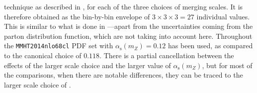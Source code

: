 technique as described in \cite{Frederix:2011ss}, for each of the
three choices of merging scales. It is therefore obtained
as the bin-by-bin envelope of $3 \times 3 \times 3 = 27$ individual
values. This is similar to what is done in
\cite{Frederix:2015eii}---apart from the uncertainties coming
from the parton distribution function, which are not taking into
account here. Throughout the \texttt{MMHT2014nlo68cl} PDF set with 
$\alpha_\mathrm{s}(m_Z)=0.12$ has been used, as compared to the canonical choice
of $0.118$. There is a partial cancellation between the effects of the larger scale choice
and the larger  value of $\alpha_\mathrm{s}(m_Z)$, but for most of the comparisons, 
when there are notable differences, they can be traced to the larger scale choice of \MGaMC. 
